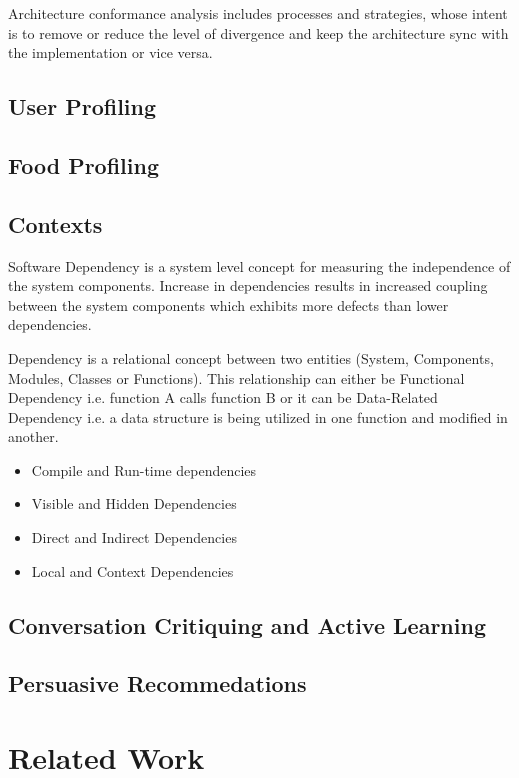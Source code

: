 Architecture conformance analysis includes processes and strategies, whose intent is to remove or reduce the level of divergence and keep the architecture sync with the implementation or vice versa.

\subsection{User Profiling}

\subsection{Food Profiling}

\subsection{Contexts}
Software Dependency is a system level concept for measuring the independence of the system components. Increase in dependencies results in increased coupling between the system components which exhibits more defects than lower dependencies.\newline

Dependency is a relational concept between two entities (System, Components, Modules, Classes or Functions). This relationship can either be Functional Dependency i.e. function A calls function B or it can be Data-Related Dependency i.e. a data structure is being utilized in one function and modified in another.\newline

\begin{itemize}
\item Compile and Run-time dependencies 
\item Visible and Hidden Dependencies
\item Direct and Indirect Dependencies 
\item Local and Context Dependencies  
\end{itemize}

\subsection{Conversation Critiquing and Active Learning}

\subsection{Persuasive Recommedations}

\section{Related Work}

